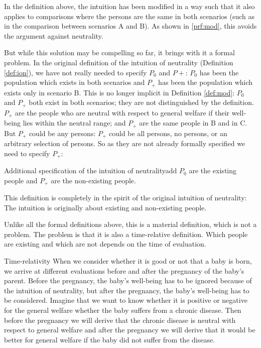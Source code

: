In the definition above, the intuition has been modified in a way such that it also applies to comparisons where the persons are the same in both scenarios (such as in the comparison between scenarios A and B). As shown in \ref{prf:mod}, this avoids the argument against neutrality. 

But while this solution may be compelling so far, it brings with it a formal problem. In the original definition of the intuition of neutrality (Definition \ref{def:ion}), we have not really needed to specify $P_0$ and $P+$: $P_0$ has been the population which exists in both scenarios and $P_+$ has been the population which exists only in scenario B. This is no longer implicit in Definition \ref{def:mod}: $P_0$ and $P_+$ both exist in both scenarios; they are not distinguished by the definition. $P_+$ are the people who are neutral with respect to general welfare if their well-being lies within the neutral range; and $P_+$ are the same people in B and in C. But $P_+$ could be any persons: $P_+$ could be all persons, no persons, or an arbitrary selection of persons. So as they are not already formally specified we need to specify $P_+$:

\begin{Definition}{Additional specification of the intuition of neutrality}{add}
$P_0$ are the existing people and $P_+$ are the non-existing people.
\end{Definition}

This definition is completely in the spirit of the original intuition of neutrality: The intuition is originally about existing and non-existing people. 

Unlike all the formal definitions above, this is a material definition, which is not a problem. The problem is that it is also a time-relative definition. Which people are existing and which are not depends on the time of evaluation. 

\begin{Example}{Time-relativity}{}
When we consider whether it is good or not that a baby is born, we arrive at different evaluations before and after the pregnancy of the baby's parent. Before the pregnancy, the baby's well-being has to be ignored because of the intuition of neutrality, but after the pregnancy, the baby's well-being has to be considered. Imagine that we want to know whether it is positive or negative for the general welfare whether the baby suffers from a chronic disease. Then before the pregnancy we will derive that the chronic disease is neutral with respect to general welfare and after the pregnancy we will derive that it would be better for general welfare if the baby did not suffer from the disease. 
\end{Example}

